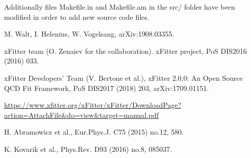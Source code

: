 \documentclass{article}
\begin{document}
\noindent Additionally files Makefile.in and Makefile.am in the src/ folder have been modified in order to add new source code files.


\begin{thebibliography}{99}

 M. Walt, I. Helenius, W. Vogelsang, arXiv:1908.03355.

 xFitter team (O. Zenaiev for the collaboration). xFitter project, PoS DIS2016 (2016) 033.

 xFitter Developers' Team (V. Bertone et al.), xFitter 2.0.0: An Open Source QCD Fit Framework, PoS DIS2017 (2018) 203, arXiv:1709.01151.

 \url{https://www.xfitter.org/xFitter/xFitter/DownloadPage?action=AttachFile&do=view&target=manual.pdf}

 H. Abramowicz et al., Eur.Phys.J. C75 (2015) no.12, 580.

 K. Kovarik et al., Phys.Rev. D93 (2016) no.8, 085037.


\end{thebibliography}
\end{document}
